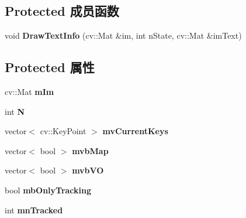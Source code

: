 \subsection*{Protected 成员函数}
\begin{DoxyCompactItemize}
\item 
\hypertarget{classORB__SLAM2_1_1FrameDrawer_a059f66cfb0702264c788a79313ec3630}{void {\bfseries Draw\-Text\-Info} (cv\-::\-Mat \&im, int n\-State, cv\-::\-Mat \&im\-Text)}\label{classORB__SLAM2_1_1FrameDrawer_a059f66cfb0702264c788a79313ec3630}

\end{DoxyCompactItemize}
\subsection*{Protected 属性}
\begin{DoxyCompactItemize}
\item 
\hypertarget{classORB__SLAM2_1_1FrameDrawer_a2b405554be1a48ade50055af97c2c2c9}{cv\-::\-Mat {\bfseries m\-Im}}\label{classORB__SLAM2_1_1FrameDrawer_a2b405554be1a48ade50055af97c2c2c9}

\item 
\hypertarget{classORB__SLAM2_1_1FrameDrawer_adbc9489192f5485ece966b0d6d589e47}{int {\bfseries N}}\label{classORB__SLAM2_1_1FrameDrawer_adbc9489192f5485ece966b0d6d589e47}

\item 
\hypertarget{classORB__SLAM2_1_1FrameDrawer_a35ec8c5aea5cffee69ac5cec6abb5871}{vector$<$ cv\-::\-Key\-Point $>$ {\bfseries mv\-Current\-Keys}}\label{classORB__SLAM2_1_1FrameDrawer_a35ec8c5aea5cffee69ac5cec6abb5871}

\item 
\hypertarget{classORB__SLAM2_1_1FrameDrawer_aa7d745757f0a81f8460236036b837b0e}{vector$<$ bool $>$ {\bfseries mvb\-Map}}\label{classORB__SLAM2_1_1FrameDrawer_aa7d745757f0a81f8460236036b837b0e}

\item 
\hypertarget{classORB__SLAM2_1_1FrameDrawer_ab47bccbb2ddfa65221a968736a6bd092}{vector$<$ bool $>$ {\bfseries mvb\-V\-O}}\label{classORB__SLAM2_1_1FrameDrawer_ab47bccbb2ddfa65221a968736a6bd092}

\item 
\hypertarget{classORB__SLAM2_1_1FrameDrawer_ad7087ccda3d514be5e0132f889c3e949}{bool {\bfseries mb\-Only\-Tracking}}\label{classORB__SLAM2_1_1FrameDrawer_ad7087ccda3d514be5e0132f889c3e949}

\item 
\hypertarget{classORB__SLAM2_1_1FrameDrawer_ae111426e790338d9f5f4556434716919}{int {\bfseries mn\-Tracked}}\label{classORB__SLAM2_1_1FrameDrawer_ae111426e790338d9f5f4556434716919}


\end{DoxyCompactItemize}
